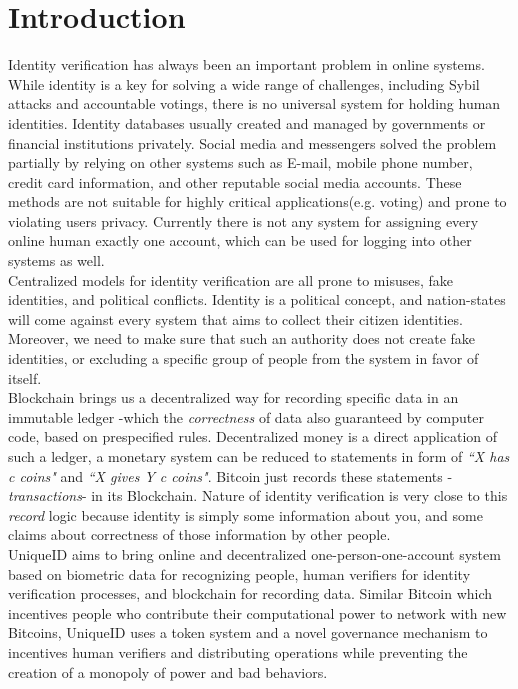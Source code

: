 \documentclass[conference]{IEEEtran}
\begin{document}
\section{Introduction}
Identity verification has always been an important problem in online systems. While identity is a key for solving a wide range of challenges, including Sybil attacks and accountable votings, there is no universal system for holding human identities. Identity databases usually created and managed by governments or financial institutions privately. Social media and messengers solved the problem partially by relying on other systems such as E-mail, mobile phone number, credit card information, and other reputable social media accounts. These methods are not suitable for highly critical applications(e.g. voting) and prone to violating users privacy. Currently there is not any system for assigning every online human exactly one account, which can be used for logging into other systems as well.
\\
Centralized models for identity verification are all prone to misuses, fake identities, and political conflicts. Identity is a political concept, and nation-states will come against every system that aims to collect their citizen identities. Moreover, we need to make sure that such an authority does not create fake identities, or excluding a specific group of people from the system in favor of itself.
\\
Blockchain brings us a decentralized way for recording specific data in an immutable ledger -which the \textit{correctness} of data also guaranteed by computer code, based on prespecified rules. Decentralized money is a direct application of such a ledger, a monetary system can be reduced to statements in form of \textit{``X has c coins"} and \textit{``X gives Y c coins"}. Bitcoin \cite{bitcoin} just records these statements -\textit{transactions}- in its Blockchain. Nature of identity verification is very close to this \textit{record} logic because identity is simply some information about you, and some claims about correctness of those information by other people. 
\\
UniqueID aims to bring online and decentralized one-person-one-account system based on biometric data for recognizing people, human verifiers for identity verification processes, and blockchain for recording data. Similar Bitcoin which incentives people who contribute their computational power to network with new Bitcoins, UniqueID uses a token system and a novel governance mechanism to incentives human verifiers and distributing operations while preventing the creation of a monopoly of power and bad behaviors.
\end{document}
